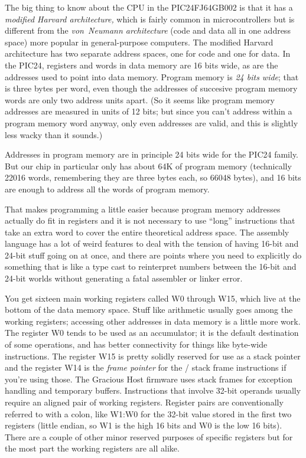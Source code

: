 The big thing to know about the CPU in the PIC24FJ64GB002 is that it has a
\emph{modified Harvard architecture,} which is fairly common in
microcontrollers but is different from the \emph{von~Neumann architecture}
(code and data all in one address space) more popular in general-purpose
computers.  The modified Harvard architecture has two separate address
spaces, one for code and one for data.  In the PIC24, registers and words in
data memory are 16 bits wide, as are the addresses used to point into data
memory.  Program memory is \emph{24 bits wide}; that is three bytes per
word, even though the addresses of succesive program memory words are only
two address units apart.  (So it seems like program memory addresses are
measured in units of 12 bits; but since you can't address within a program
memory word anyway, only even addresses are valid, and this is slightly less
wacky than it sounds.)

Addresses in program memory are in principle 24 bits wide for the PIC24
family.  But our chip in particular only has about 64K of program memory
(technically 22016 words, remembering they are three bytes each, so 66048
bytes), and 16 bits are enough to address all the words of program memory. 

That makes programming a little easier because program memory addresses
actually do fit in registers and it is not necessary to use ``long''
instructions that take an extra word to cover the entire theoretical address
space.  The assembly language has a lot of weird features to deal with the
tension of having 16-bit and 24-bit stuff going on at once, and there are
points where you need to explicitly do something that is like a type cast to
reinterpret numbers between the 16-bit and 24-bit worlds without generating
a fatal assembler or linker error.

You get sixteen main working registers called W0 through W15, which live at
the bottom of the data memory space.  Stuff like arithmetic usually goes
among the working registers; accessing other addresses in data memory is a
little more work.  The register W0 tends to be used as an accumulator; it is
the default destination of some operations, and has better connectivity for
things like byte-wide instructions.  The register W15 is pretty solidly
reserved for use as a stack pointer and the register W14 is the \emph{frame
pointer} for the / stack frame instructions if you're
using those.  The Gracious Host firmware uses stack frames for exception
handling and temporary buffers.  Instructions that involve 32-bit operands
usually require an aligned pair of working registers.  Register pairs are
conventionally referred to with a colon, like W1:W0 for the 32-bit value
stored in the first two registers (little endian, so W1 is the high 16 bits
and W0 is the low 16 bits).  There are a couple of other minor reserved
purposes of specific registers but for the most part the working registers
are all alike.

